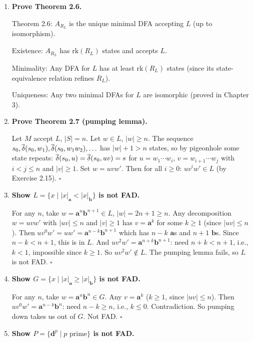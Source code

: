 \begin{enumerate}[{2.}1.]
\item \textbf{Prove Theorem 2.6.}

Theorem 2.6: $A_{R_L}$ is the unique minimal DFA accepting $L$ (up to isomorphism).

Existence: $A_{R_L}$ has $\mathrm{rk}(R_L)$ states and accepts $L$.

Minimality: Any DFA for $L$ has at least $\mathrm{rk}(R_L)$ states (since its state-equivalence relation refines $R_L$).

Uniqueness: Any two minimal DFAs for $L$ are isomorphic (proved in Chapter 3).

\item \textbf{Prove Theorem 2.7 (pumping lemma).}

Let $M$ accept $L$, $|S|=n$. Let $w\in L$, $|w|\geq n$. The sequence $s_0,\overline{\delta}(s_0,w_1),\overline{\delta}(s_0,w_1w_2),\ldots$ has $|w|+1>n$ states, so by pigeonhole some state repeats: $\overline{\delta}(s_0,u)=\overline{\delta}(s_0,uv)=s$ for $u=w_1\cdots w_i$, $v=w_{i+1}\cdots w_j$ with $i<j\leq n$ and $|v|\geq 1$. Set $w=uvw'$. Then for all $i\geq 0$: $uv^iw'\in L$ (by Exercise 2.15). $\square$

\item \textbf{Show $L=\{x\mid|x|_\mathbf{a}<|x|_\mathbf{b}\}$ is not FAD.}

For any $n$, take $w=\mathbf{a}^n\mathbf{b}^{n+1}\in L$, $|w|=2n+1\geq n$. Any decomposition $w=uvw'$ with $|uv|\leq n$ and $|v|\geq 1$ has $v=\mathbf{a}^k$ for some $k\geq 1$ (since $|uv|\leq n$). Then $uv^0w'=uw'=\mathbf{a}^{n-k}\mathbf{b}^{n+1}$ which has $n-k$ $\mathbf{a}$s and $n+1$ $\mathbf{b}$s. Since $n-k<n+1$, this is in $L$. And $uv^2w'=\mathbf{a}^{n+k}\mathbf{b}^{n+1}$: need $n+k < n+1$, i.e., $k<1$, impossible since $k\geq 1$. So $uv^2w'\notin L$. The pumping lemma fails, so $L$ is not FAD. $\square$

\item \textbf{Show $G=\{x\mid|x|_\mathbf{a}\geq|x|_\mathbf{b}\}$ is not FAD.}

For any $n$, take $w=\mathbf{a}^n\mathbf{b}^n\in G$. Any $v=\mathbf{a}^k$ ($k\geq 1$, since $|uv|\leq n$). Then $uv^0w'=\mathbf{a}^{n-k}\mathbf{b}^n$: need $n-k\geq n$, i.e., $k\leq 0$. Contradiction. So pumping down takes us out of $G$. Not FAD. $\square$

\item \textbf{Show $P=\{\mathbf{d}^p\mid p\text{ prime}\}$ is not FAD.}


\end{enumerate}
